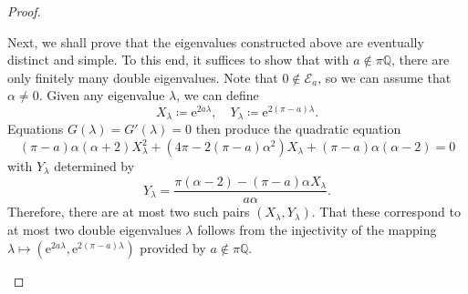 \documentclass[11pt, a4paper,reqno]{amsart}
\theoremstyle{plain}
\theoremstyle{definition}
\theoremstyle{remark}
\newcommand{\1}{\mathds 1}
\begin{document}
\begin{proof}
\begin{enumerate}
        Next, we shall prove that the eigenvalues constructed above are eventually distinct and simple. To this end, it suffices to show that with $a \notin \pi\mathbb Q$, there are only finitely many double eigenvalues. Note that $0 \notin \mathcal E_a$, so we can assume that $\alpha \neq 0$. Given any eigenvalue $\lambda$, we can define
        \[
        X_\lambda \coloneqq \mathrm{e}^{2a\lambda}, \quad Y_\lambda \coloneqq \mathrm{e}^{2(\pi-a)\lambda}.
        \]
        Equations $G(\lambda) = G'(\lambda) = 0$ then produce the quadratic equation
        \[
        (\pi-a)\alpha(\alpha + 2)X_\lambda^2 + (4\pi - 2(\pi-a)\alpha^2)X_\lambda + (\pi-a)\alpha(\alpha-2) = 0
        \]
        with $Y_\lambda$ determined by
        \[
        Y_\lambda = \frac{\pi(\alpha-2) - (\pi-a)\alpha X_\lambda}{a\alpha}.
        \]
        Therefore, there are at most two such pairs $(X_\lambda, Y_\lambda)$. That these correspond to at most two double eigenvalues $\lambda$ follows from the injectivity of the mapping $\lambda \mapsto (\mathrm{e}^{2a\lambda}, \mathrm{e}^{2(\pi-a)\lambda})$ provided by $a \notin \pi\mathbb Q$.


\end{enumerate}
\end{proof}
\end{document}
